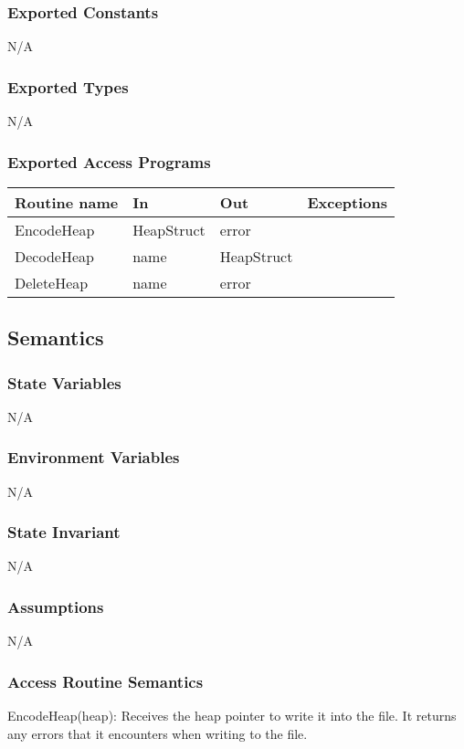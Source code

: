 \documentclass[12pt]{article}
\begin{document}
\subsubsection {Exported Constants}
N/A
\subsubsection {Exported Types}
N/A
\subsubsection {Exported Access Programs}

\begin{tabular}{| l | l | l | l |}
\hline
\textbf{Routine name} & \textbf{In} & \textbf{Out} & \textbf{Exceptions}\\
\hline
EncodeHeap & HeapStruct & error & \\
\hline
DecodeHeap & name & HeapStruct & \\
\hline
DeleteHeap & name & error & \\
\hline
\end{tabular}

\subsection {Semantics}

\subsubsection {State Variables}
N/A
\subsubsection {Environment Variables}
N/A
\subsubsection {State Invariant}
N/A
\subsubsection {Assumptions}
N/A

\subsubsection{Access Routine Semantics}
\noindent EncodeHeap(heap): Receives the heap pointer to write it into the file. It returns any errors that it encounters when writing to the file. \\
\end{document}
